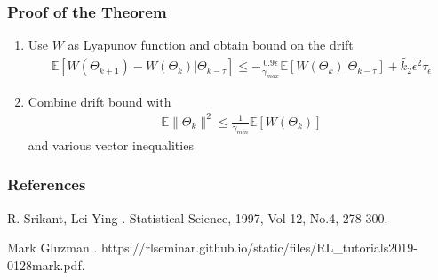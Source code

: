 \documentclass[t,10pt]{beamer}
\newcommand{\E}{\mathbb{E}}
\theoremstyle{remark}
\begin{document}



\begin{frame}
\frametitle{Proof of the Theorem}
\begin{enumerate}
\item Use $W$ as Lyapunov function and obtain bound on the drift
\begin{align}
\E[W(\Theta_{k+1})-W(\Theta_{k})| \Theta_{k-\tau} ]  \leq -\frac{0.9\epsilon}{\gamma_{max}}\E[W(\Theta_{k})| \Theta_{k-\tau} ]+\tilde{k_2}\epsilon^2\tau_\epsilon
\end{align}
\item  Combine drift bound with
\begin{align}
\E\|\Theta_k\|^2 \leq \frac{1}{\gamma_{min}} \E[W(\Theta_k)]
\end{align}
and various vector inequalities 
\end{enumerate}


\end{frame}












\begin{frame}
\frametitle{References}
\footnotesize{

\begin{thebibliography}{99}    
  \beamertemplatebookbibitems
  
   R. Srikant, Lei Ying  
    .
    \newblock Statistical Science, 1997, Vol 12, No.4, 278-300.
  
    Mark Gluzman
    .
    \newblock https://rlseminar.github.io/static/files/RL\_tutorials2019-0128mark.pdf. 

	\end{thebibliography}
}


\end{frame}
\end{document}
